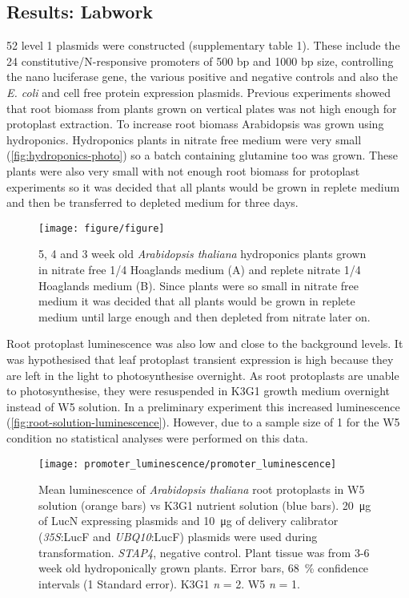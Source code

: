 \subsection{Results: Labwork}
52 level 1 plasmids were constructed (supplementary table 1). These
include the 24 constitutive\fshyp{}N\hyp{}responsive promoters of 500 bp and 1000 bp size, controlling the nano luciferase gene, the various positive and negative controls and also the \textit{E. coli} and cell free protein expression plasmids. Previous experiments showed that root biomass from plants grown on vertical plates was not high enough for protoplast extraction. To increase root biomass Arabidopsis was grown using hydroponics. Hydroponics plants in nitrate free medium were very small (\autoref{fig:hydroponics-photo}) so a batch containing glutamine
too was grown. These plants were also very small with not enough root
biomass for protoplast experiments so it was decided that all plants
would be grown in replete medium and then be transferred to depleted
medium for three days.
\begin{figure}[!h]
\begin{center}
\capstart
\texttt{[image: figure/figure]}
\caption{
5, 4 and 3 week old \textit{Arabidopsis thaliana} hydroponics plants grown in nitrate free 1/4 Hoaglands medium (A) and replete nitrate 1/4 Hoaglands medium (B). Since plants were so small in nitrate free medium it was decided that all plants would be grown in replete medium until large enough and then depleted from nitrate later on.
\label{fig:hydroponics-photo}
}
\end{center}
\end{figure}

Root protoplast luminescence was also low and close to the background
levels. It was hypothesised that leaf protoplast transient expression is high because they are left in the light to photosynthesise overnight. As root protoplasts are unable to photosynthesise, they were resuspended in K3G1 growth medium overnight instead of W5 solution. In a preliminary
experiment this increased luminescence
(\autoref{fig:root-solution-luminescence}). However, due to a sample size of 1 for the W5 condition no statistical analyses were performed on this data.

\begin{figure}[!h]
\begin{center}
\capstart
\texttt{[image: promoter\_luminescence/promoter\_luminescence]}
\caption{
Mean luminescence of \textit{Arabidopsis thaliana} root protoplasts in W5 solution (orange bars) vs K3G1 nutrient solution (blue bars). \SI{20}{\micro\gram} of
LucN expressing plasmids and \SI{10}{\micro\gram} of delivery calibrator
(\textit{35S}:LucF and \textit{UBQ10}:LucF) plasmids were used during
transformation. \textit{STAP4}, negative control. Plant tissue was from 3-6 week old hydroponically grown plants. Error bars, \SI{68}{\percent} confidence intervals (1 Standard error). K3G1 \textit{n} = 2. W5 \textit{n} = 1.
\label{fig:root-solution-luminescence}
}
\end{center}
\end{figure}

